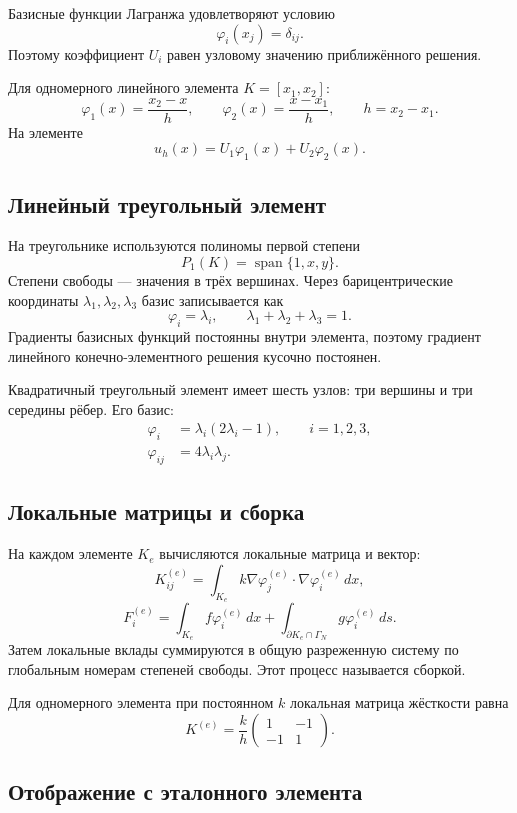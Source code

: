 Базисные функции Лагранжа удовлетворяют условию
\[
    \varphi_i(x_j)=\delta_{ij}.
\]
Поэтому коэффициент $U_i$ равен узловому значению приближённого решения.

Для одномерного линейного элемента $K=[x_1,x_2]$:
\[
    \varphi_1(x)=\frac{x_2-x}{h},
    \qquad
    \varphi_2(x)=\frac{x-x_1}{h},
    \qquad h=x_2-x_1.
\]
На элементе
\[
    u_h(x)=U_1\varphi_1(x)+U_2\varphi_2(x).
\]

\subsection{Линейный треугольный элемент}

На треугольнике используются полиномы первой степени
\[
    P_1(K)=\operatorname{span}\{1,x,y\}.
\]
Степени свободы --- значения в трёх вершинах. Через барицентрические координаты
$\lambda_1,\lambda_2,\lambda_3$ базис записывается как
\[
    \varphi_i=\lambda_i,
    \qquad
    \lambda_1+\lambda_2+\lambda_3=1.
\]
Градиенты базисных функций постоянны внутри элемента, поэтому градиент линейного
конечно-элементного решения кусочно постоянен.

Квадратичный треугольный элемент имеет шесть узлов: три вершины и три середины
рёбер. Его базис:
\[
\begin{aligned}
\varphi_i&=\lambda_i(2\lambda_i-1),\qquad i=1,2,3,\\
\varphi_{ij}&=4\lambda_i\lambda_j.
\end{aligned}
\]

\subsection{Локальные матрицы и сборка}

На каждом элементе $K_e$ вычисляются локальные матрица и вектор:
\[
    K_{ij}^{(e)}=
    \int_{K_e}k\nabla\varphi_j^{(e)}\cdot\nabla\varphi_i^{(e)}\,dx,
\]
\[
    F_i^{(e)}=
    \int_{K_e}f\varphi_i^{(e)}\,dx
    +\int_{\partial K_e\cap\Gamma_N}g\varphi_i^{(e)}\,ds.
\]
Затем локальные вклады суммируются в общую разреженную систему по глобальным
номерам степеней свободы. Этот процесс называется сборкой.

Для одномерного элемента при постоянном $k$ локальная матрица жёсткости равна
\[
    K^{(e)}=\frac{k}{h}
    \begin{pmatrix}
    1&-1\\
    -1&1
    \end{pmatrix}.
\]

\subsection{Отображение с эталонного элемента}

